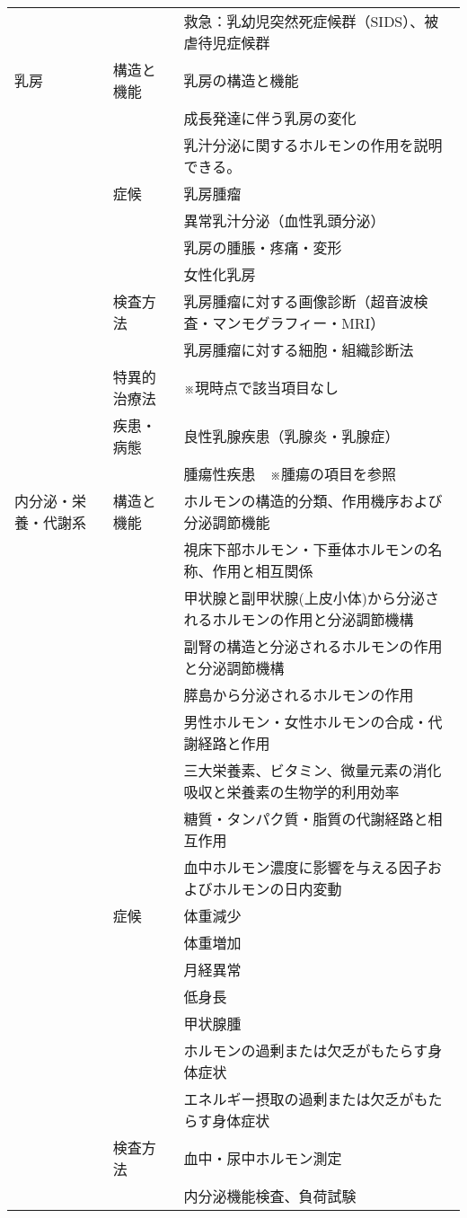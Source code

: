 \begin{xltabular}{\linewidth}{XXX}
 &  & 救急：乳幼児突然死症候群（SIDS）、被虐待児症候群 \\
乳房 & 構造と機能 & 乳房の構造と機能 \\
 &  & 成長発達に伴う乳房の変化 \\
 &  & 乳汁分泌に関するホルモンの作用を説明できる。 \\
 & 症候 & 乳房腫瘤 \\
 &  & 異常乳汁分泌（血性乳頭分泌） \\
 &  & 乳房の腫脹・疼痛・変形 \\
 &  & 女性化乳房 \\
 & 検査方法 & 乳房腫瘤に対する画像診断（超音波検査・マンモグラフィー・MRI） \\
 &  & 乳房腫瘤に対する細胞・組織診断法 \\
 & 特異的治療法 & ※現時点で該当項目なし \\
 & 疾患・病態 & 良性乳腺疾患（乳腺炎・乳腺症） \\
 &  & 腫瘍性疾患　※腫瘍の項目を参照 \\
内分泌・栄養・代謝系 & 構造と機能 & ホルモンの構造的分類、作用機序および分泌調節機能 \\
 &  & 視床下部ホルモン・下垂体ホルモンの名称、作用と相互関係 \\
 &  & 甲状腺と副甲状腺(上皮小体)から分泌されるホルモンの作用と分泌調節機構 \\
 &  & 副腎の構造と分泌されるホルモンの作用と分泌調節機構 \\
 &  & 膵島から分泌されるホルモンの作用 \\
 &  & 男性ホルモン・女性ホルモンの合成・代謝経路と作用 \\
 &  & 三大栄養素、ビタミン、微量元素の消化吸収と栄養素の生物学的利用効率 \\
 &  & 糖質・タンパク質・脂質の代謝経路と相互作用 \\
 &  & 血中ホルモン濃度に影響を与える因子およびホルモンの日内変動 \\
 & 症候 & 体重減少 \\
 &  & 体重増加 \\
 &  & 月経異常 \\
 &  & 低身長 \\
 &  & 甲状腺腫 \\
 &  & ホルモンの過剰または欠乏がもたらす身体症状 \\
 &  & エネルギー摂取の過剰または欠乏がもたらす身体症状 \\
 & 検査方法 & 血中・尿中ホルモン測定 \\
 &  & 内分泌機能検査、負荷試験 \\

\end{xltabular}

